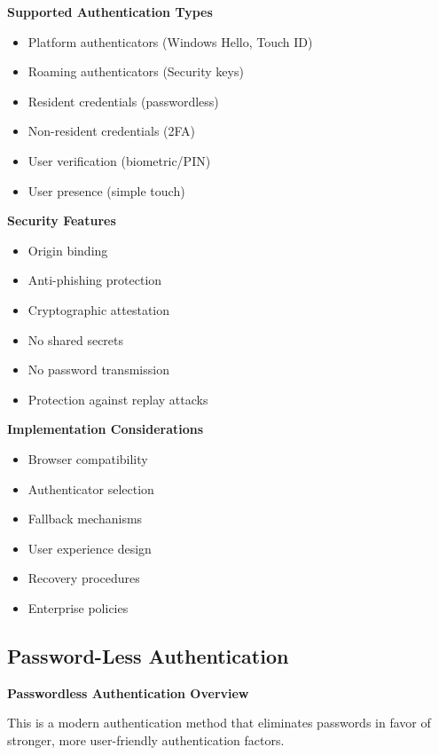 \textbf{Supported Authentication Types}
\begin{itemize}
    \item Platform authenticators (Windows Hello, Touch ID)
    \item Roaming authenticators (Security keys)
    \item Resident credentials (passwordless)
    \item Non-resident credentials (2FA)
    \item User verification (biometric/PIN)
    \item User presence (simple touch)
\end{itemize}

\textbf{Security Features}
\begin{itemize}
    \item Origin binding
    \item Anti-phishing protection
    \item Cryptographic attestation
    \item No shared secrets
    \item No password transmission
    \item Protection against replay attacks
\end{itemize}

\textbf{Implementation Considerations}
\begin{itemize}
    \item Browser compatibility
    \item Authenticator selection
    \item Fallback mechanisms
    \item User experience design
    \item Recovery procedures
    \item Enterprise policies
\end{itemize}

\subsection{Password-Less Authentication}
\textbf{Passwordless Authentication Overview}

This is a modern authentication method that eliminates passwords in favor of stronger, more user-friendly authentication factors.


